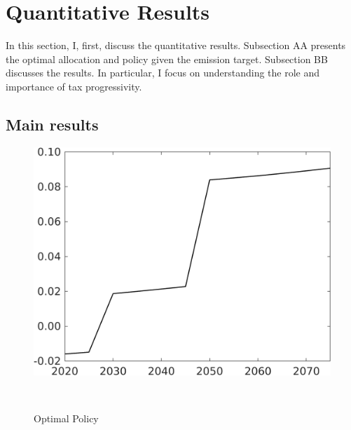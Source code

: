\section{Quantitative Results}

In this section, I, first, discuss the quantitative results.
Subsection AA presents the optimal allocation and policy given the emission target. Subsection BB discusses the results. In particular, I focus on understanding the role and importance of tax progressivity. 

\subsection{Main results}
\begin{figure}[h!!]
	\centering
	\caption{Optimal Policy }\label{fig:optPol}
	\begin{minipage}[]{0.4\textwidth}
		\includegraphics[width=1\textwidth]{../../codding_model/own_basedOnFried/optimalPol_elastS_DisuSci/figures/all_1705/Single_OPT_T_NoTaus_taul_spillover0_sep1_BN0_ineq0_etaa0.79.png}
	\end{minipage}
\begin{minipage}[]{0.1\textwidth}
\
\end{minipage}
	\begin{minipage}[]{0.4\textwidth}

\end{minipage}
\end{figure}
